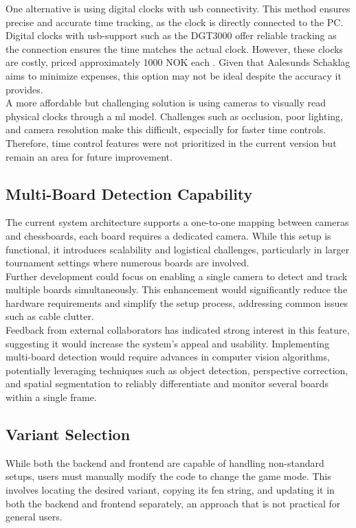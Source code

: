 One alternative is using digital clocks with \gls{usb} connectivity. This method ensures precise and accurate time tracking, as the clock is directly connected to the PC. Digital clocks with \gls{usb}-support such as the DGT3000 offer reliable tracking as the connection ensures the time matches the actual clock. However, these clocks are costly, priced approximately 1000 NOK each \cite{sjakkbutikken:dgt-clock}. Given that Aalesunds Schaklag aims to minimize expenses, this option may not be ideal despite the accuracy it provides. \\

A more affordable but challenging solution is using cameras to visually read physical clocks through a \gls{ml} model. Challenges such as occlusion, poor lighting, and camera resolution make this difficult, especially for faster time controls. \\

Therefore, time control features were not prioritized in the current version but remain an area for future improvement.

\subsection{Multi-Board Detection Capability}
The current system architecture supports a one-to-one mapping between cameras and chessboards, each board requires a dedicated camera. While this setup is functional, it introduces scalability and logistical challenges, particularly in larger tournament settings where numerous boards are involved. \\

Further development could focus on enabling a single camera to detect and track multiple boards simultaneously. This enhancement would significantly reduce the hardware requirements and simplify the setup process, addressing common issues such as cable clutter. \\

Feedback from external collaborators has indicated strong interest in this feature, suggesting it would increase the system's appeal and usability. Implementing multi-board detection would require advances in computer vision algorithms, potentially leveraging techniques such as object detection, perspective correction, and spatial segmentation to reliably differentiate and monitor several boards within a single frame.

\subsection{Variant Selection}
While both the backend and frontend are capable of handling non-standard setups, users must manually modify the code to change the game mode. This involves locating the desired variant, copying its \gls{fen} string, and updating it in both the backend and frontend separately, an approach that is not practical for general users. \\

